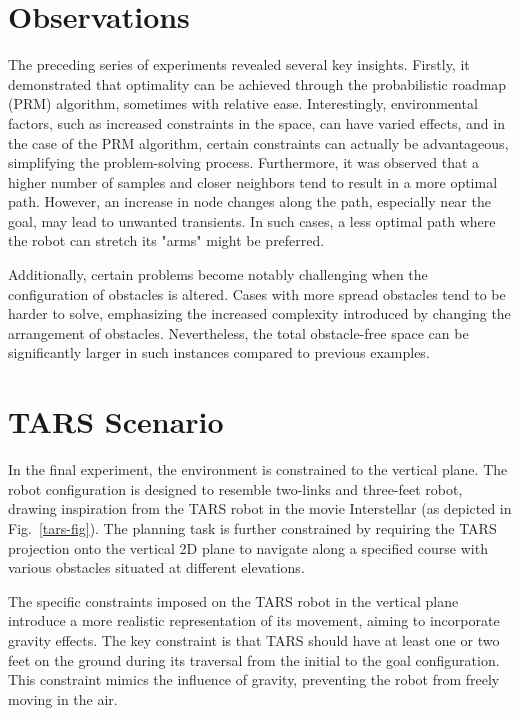 \documentclass{IEEEtaes}
\begin{document}
\section{\large \textbf{Observations}}
The preceding series of experiments revealed several key insights. Firstly, it demonstrated that optimality can be achieved through the probabilistic roadmap (PRM) algorithm, sometimes with relative ease. Interestingly, environmental factors, such as increased constraints in the space, can have varied effects, and in the case of the PRM algorithm, certain constraints can actually be advantageous, simplifying the problem-solving process. Furthermore, it was observed that a higher number of samples and closer neighbors tend to result in a more optimal path. However, an increase in node changes along the path, especially near the goal, may lead to unwanted transients. In such cases, a less optimal path where the robot can stretch its "arms" might be preferred.

Additionally, certain problems become notably challenging when the configuration of obstacles is altered. Cases with more spread obstacles tend to be harder to solve, emphasizing the increased complexity introduced by changing the arrangement of obstacles. Nevertheless, the total obstacle-free space can be significantly larger in such instances compared to previous examples.

\section{\large \textbf{TARS Scenario}}

In the final experiment, the environment is constrained to the vertical plane. The robot configuration is designed to resemble two-links and three-feet robot, drawing inspiration from the TARS robot in the movie Interstellar (as depicted in Fig.~\ref{tars-fig}). The planning task is further constrained by requiring the TARS projection onto the vertical 2D plane to navigate along a specified course with various obstacles situated at different elevations.

The specific constraints imposed on the TARS robot in the vertical plane introduce a more realistic representation of its movement, aiming to incorporate gravity effects. The key constraint is that TARS should have at least one or two feet on the ground during its traversal from the initial to the goal configuration. This constraint mimics the influence of gravity, preventing the robot from freely moving in the air.
\end{document}
